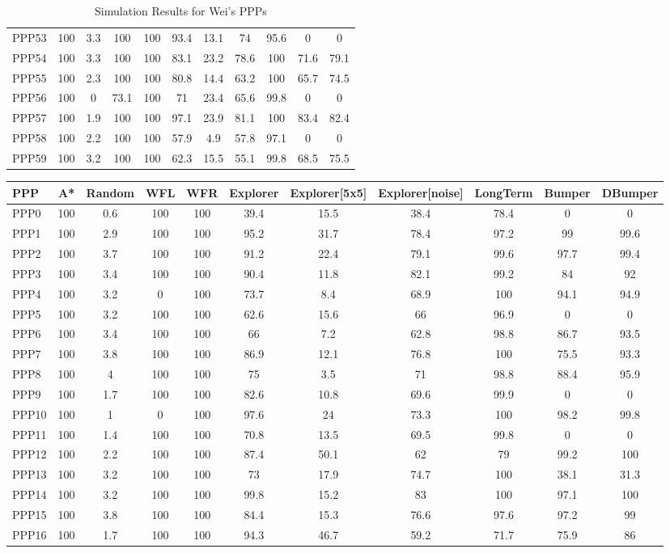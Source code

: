 \documentclass[authoryearcitations]{UoYCSproject}
\begin{document}
\begin{appendices}
\begin{table}[H]
\begin{tabular}{|l|c|c|c|c|c|c|c|c|c|c|}
PPP53&100&3.3&100&100&93.4&13.1&74&95.6&0&0\\
PPP54&100&3.3&100&100&83.1&23.2&78.6&100&71.6&79.1\\
PPP55&100&2.3&100&100&80.8&14.4&63.2&100&65.7&74.5\\
PPP56&100&0&73.1&100&71&23.4&65.6&99.8&0&0\\
PPP57&100&1.9&100&100&97.1&23.9&81.1&100&83.4&82.4\\
PPP58&100&2.2&100&100&57.9&4.9&57.8&97.1&0&0\\
PPP59&100&3.2&100&100&62.3&15.5&55.1&99.8&68.5&75.5\\
\hline
\end{tabular}
\caption{Simulation Results for Wei's PPPs}
\end{table}

\begin{table}
\scriptsize
\begin{tabular}{|l|c|c|c|c|c|c|c|c|c|c|}
\hline
PPP	& A* & Random & WFL & WFR & Explorer& Explorer[5x5] & Explorer[noise] & LongTerm & Bumper & DBumper \\
\hline
PPP0&100&0.6&100&100&39.4&15.5&38.4&78.4&0&0\\
PPP1&100&2.9&100&100&95.2&31.7&78.4&97.2&99&99.6\\
PPP2&100&3.7&100&100&91.2&22.4&79.1&99.6&97.7&99.4\\
PPP3&100&3.4&100&100&90.4&11.8&82.1&99.2&84&92\\
PPP4&100&3.2&0&100&73.7&8.4&68.9&100&94.1&94.9\\
PPP5&100&3.2&100&100&62.6&15.6&66&96.9&0&0\\
PPP6&100&3.4&100&100&66&7.2&62.8&98.8&86.7&93.5\\
PPP7&100&3.8&100&100&86.9&12.1&76.8&100&75.5&93.3\\
PPP8&100&4&100&100&75&3.5&71&98.8&88.4&95.9\\
PPP9&100&1.7&100&100&82.6&10.8&69.6&99.9&0&0\\
PPP10&100&1&0&100&97.6&24&73.3&100&98.2&99.8\\
PPP11&100&1.4&100&100&70.8&13.5&69.5&99.8&0&0\\
PPP12&100&2.2&100&100&87.4&50.1&62&79&99.2&100\\
PPP13&100&3.2&100&100&73&17.9&74.7&100&38.1&31.3\\
PPP14&100&3.2&100&100&99.8&15.2&83&100&97.1&100\\
PPP15&100&3.8&100&100&84.4&15.3&76.6&97.6&97.2&99\\
PPP16&100&1.7&100&100&94.3&46.7&59.2&71.7&75.9&86\\

\end{tabular}
\end{table}
\end{appendices}
\end{document}

